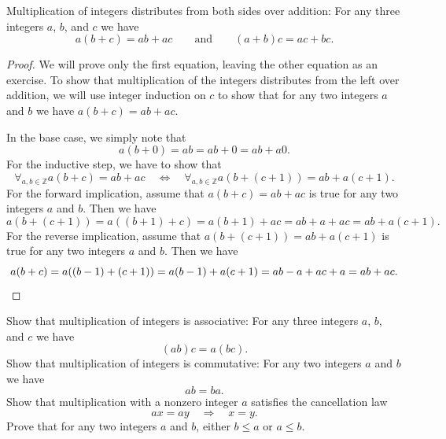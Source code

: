 \begin{theorem}
  Multiplication of integers distributes from both sides over addition: For any three integers $a$, $b$, and $c$ we have
  \begin{equation*}
    a(b+c)=ab+ac\qquad\text{and}\qquad (a+b)c=ac+bc.
  \end{equation*}
\end{theorem}

\begin{proof}
  We will prove only the first equation, leaving the other equation as an exercise. To show that multiplication of the integers distributes from the left over addition, we will use integer induction on $c$ to show that for any two integers $a$ and $b$ we have $a(b+c)=ab+ac$.

  In the base case, we simply note that
  \begin{equation*}
    a(b+0)=ab=ab+0=ab+a0.
  \end{equation*}
  For the inductive step, we have to show that
  \begin{equation*}
    \forall_{a,b\in\mathbb{Z}}a(b+c)=ab+ac\quad\Leftrightarrow\quad \forall_{a,b\in\mathbb{Z}} a(b+(c+1))=ab+a(c+1).
  \end{equation*}
  For the forward implication, assume that $a(b+c)=ab+ac$ is true for any two integers $a$ and $b$. Then we have
  \begin{equation*}
    a(b+(c+1))=a((b+1)+c)=a(b+1)+ac=ab+a+ac=ab+a(c+1).
  \end{equation*}
  For the reverse implication, assume that $a(b+(c+1))=ab+a(c+1)$ is true for any two integers $a$ and $b$. Then we have
  \begin{equation*}
    a(b+c)=a((b-1)+(c+1))=a(b-1)+a(c+1)=ab-a+ac+a=ab+ac.\qedhere
  \end{equation*}
\end{proof}

\exercises

\begin{routine}
  \exercise Show that multiplication of integers is associative: For any three integers $a$, $b$, and $c$ we have
  \begin{equation*}
    (ab)c=a(bc).
  \end{equation*}
  \exercise Show that multiplication of integers is commutative: For any two integers $a$ and $b$ we have
  \begin{equation*}
    ab=ba.
  \end{equation*}
  \exercise Show that multiplication with a nonzero integer $a$ satisfies the cancellation law
  \begin{equation*}
    ax=ay\quad\Rightarrow\quad x=y.
  \end{equation*}
  \exercise Prove that for any two integers $a$ and $b$, either $b\leq a$ or $a\leq b$.
\end{routine}


